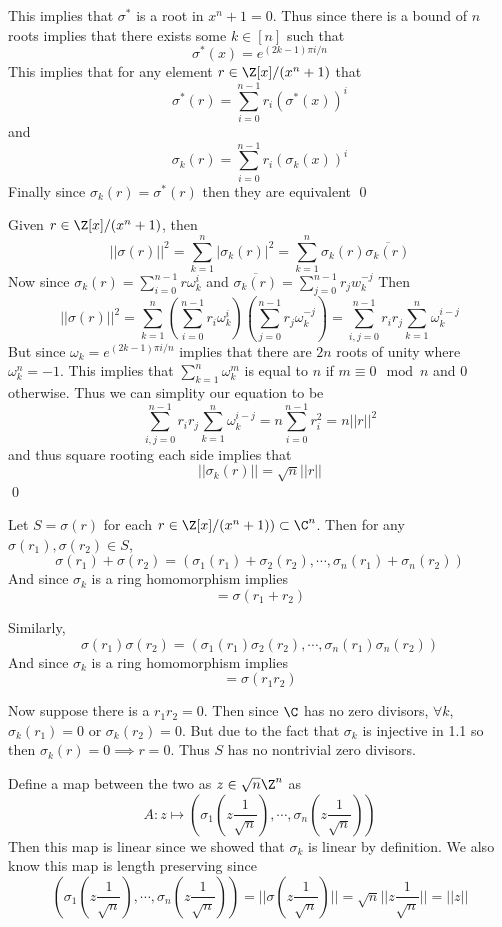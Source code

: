 \documentclass[12pt]{amsart}
\begin{document}
\begin{problem}
\begin{subproblem}
      This implies that $\sigma^*$ is a root in $x^n+1=0$. Thus since there is a bound of $n$ roots implies that there exists some $k\in [n]$ such that 
      \[\sigma^*(x)=e^{(2k-1)\pi i/n}\]
      This implies that for any element $r\in \Z[x]/(x^n+1)$ that 
      \[\sigma^*(r)=\sum_{i=0}^{n-1}r_i(\sigma^*(x))^i\]
      and 
      \[\sigma_k(r)=\sum_{i=0}^{n-1}r_i(\sigma_k(x))^i\]
      Finally since $\sigma_k(r)=\sigma^*(r)$ then they are equivalent \qed


    \end{subproblem}
    \begin{subproblem}
      Given $r\in \Z[x]/(x^n+1)$, then
      \[||\sigma(r)||^2 = \sum_{k=1}^n |\sigma_k(r)|^2=\sum_{k=1}^n \sigma_k(r)\overline{\sigma_k(r)}\]
      Now since $\sigma_k(r) = \sum_{i=0}^{n-1}r \omega_k^i$ and $\overline{\sigma_k(r)} = \sum_{j=0}^{n-1}r_j w_k^{-j}$ Then 
      \[||\sigma(r)||^2 = \sum_{k=1}^n (\sum_{i=0}^{n-1}r_i \omega_k^i)(\sum_{j=0}^{n-1}r_j\omega_k^{-j}) = \sum_{i,j=0}^{n-1}r_ir_j \sum_{k=1}^n \omega_k^{i-j}\]
    But since $\omega_k = e^{(2k-1)\pi i/n}$ implies that there are $2n$ roots of unity where $\omega_k^n=-1$. This implies that 
    $\sum_{k=1}^n \omega_k^m$ is equal to $n$ if $m\equiv 0\mod n$ and 0 otherwise. 
    Thus we can simplity our equation to be 
    \[\sum_{i,j=0}^{n-1}r_ir_j \sum_{k=1}^n \omega_k^{i-j} = n\sum_{i=0}^{n-1}r_i^2 = n||r||^2\]
    and thus square rooting each side implies that 
    \[||\sigma_k(r)|| = \sqrt{n}||r||\]\qed
    \end{subproblem}
    \begin{subproblem}
      Let $S=\sigma(r)$ for each $r\in \Z[x]/(x^n+1)) \subset \C^n$. Then for any $\sigma(r_1), \sigma(r_2)\in S$,
      \[\sigma(r_1)+\sigma(r_2)=(\sigma_1(r_1)+\sigma_2(r_2), \cdots, \sigma_n(r_1)+ \sigma_n(r_2))\]
    And since $\sigma_k$ is a ring homomorphism implies 
  \[=\sigma(r_1+r_2)\]
  
  Similarly, 
      \[\sigma(r_1)\sigma(r_2)=(\sigma_1(r_1)\sigma_2(r_2), \cdots, \sigma_n(r_1) \sigma_n(r_2))\]
    And since $\sigma_k$ is a ring homomorphism implies 
  \[=\sigma(r_1r_2)\]

  Now suppose there is a $r_1 r_2 = 0$. Then since $\C$ has no zero divisors, $\forall k$, $\sigma_k(r_1)=0$ or $\sigma_k(r_2)=0$. But due to the fact that $\sigma_k$ is injective  in 1.1 so then $\sigma_k(r)=0\implies r=0$. Thus $S$ has no nontrivial zero divisors.

  Define a map between the two as $z\in \sqrt{n}\Z^n$ as 
  \[A:z\mapsto (\sigma_1(z\frac{1}{\sqrt{n}}), \cdots, \sigma_n(z\frac{1}{\sqrt{n}}))\]
  Then this map is linear since we showed that $\sigma_k$ is linear by definition. We also know this map is length preserving since 
  \[(\sigma_1(z\frac{1}{\sqrt{n}}), \cdots, \sigma_n(z\frac{1}{\sqrt{n}})) = ||\sigma(z\frac{1}{\sqrt{n}})|| = \sqrt{n} ||z\frac{1}{\sqrt{n}}||= ||z||\]


    \end{subproblem}
  \end{problem}
\end{document}
